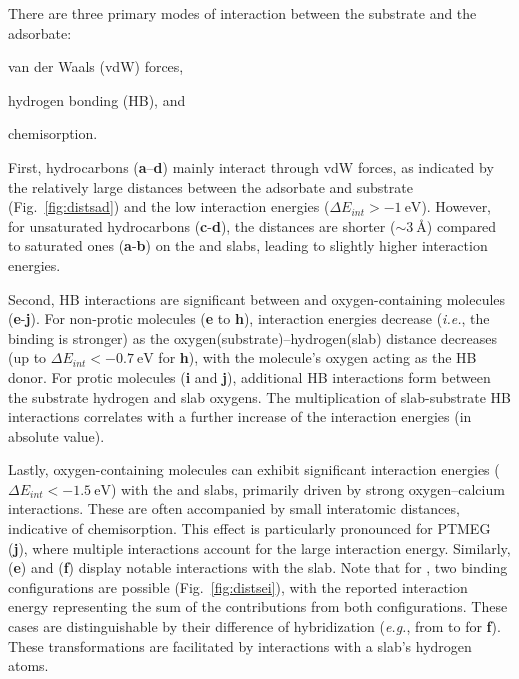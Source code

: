 \documentclass[%
aip,
amsmath,amssymb,
preprint,%
jcp,
showkeys,
]{revtex4-2}
\begin{document}
\clearpage

There are three primary modes of interaction between the substrate and the adsorbate: \begin{inparaenum}[i)] \item van der Waals (vdW) forces, 
\item hydrogen bonding (HB), and 
\item chemisorption. 
\end{inparaenum}
First, hydrocarbons (\textbf{a}–\textbf{d}) mainly interact through vdW forces, as indicated by the relatively large distances between the adsorbate and substrate (Fig.~\ref{fig:distsad}) and the low interaction energies ($\Delta E_{int} > \SI{-1}{\electronvolt}$). However, for unsaturated hydrocarbons (\textbf{c}-\textbf{d}), the distances are shorter ($\sim\SI{3}{\angstrom}$) compared to saturated ones (\textbf{a}-\textbf{b}) on the  and  slabs, leading to slightly higher interaction energies.

Second, HB interactions are significant between  and oxygen-containing mole\-cules (\textbf{e}-\textbf{j}). For non-protic molecules (\textbf{e} to \textbf{h}), interaction energies decrease (\textit{i.e.}, the binding is stronger) as the oxygen(substrate)--hydrogen(slab) distance decreases (up to $\Delta E_{int}<-$$\SI{0.7}{\electronvolt}$ for \textbf{h}), with the molecule's oxygen acting as the HB donor. For protic molecules (\textbf{i} and \textbf{j}), additional HB interactions form between the substrate hydrogen and slab oxygens. The multiplication of slab-substrate HB interactions correlates with a further increase of the interaction energies (in absolute value).


Lastly, oxygen-containing molecules can exhibit significant interaction energies ($\Delta E_{int} < \SI{-1.5}{\electronvolt}$) with the  and  slabs, primarily driven by strong oxygen--calcium interactions. These are often accompanied by small interatomic distances, indicative of chemisorption. This effect is particularly pronounced for PTMEG (\textbf{j}), where multiple interactions account for the large interaction energy. Similarly,  (\textbf{e}) and  (\textbf{f}) display notable interactions with the  slab. Note that for  , two binding configurations are possible (Fig.~\ref{fig:distsei}), with the reported interaction energy representing the sum of the contributions from both configurations. These cases are distinguishable by their difference of hybridization (\textit{e.g.}, from  to  for \textbf{f}). These transformations are facilitated by interactions with a slab’s hydrogen  atoms.
\end{document}
